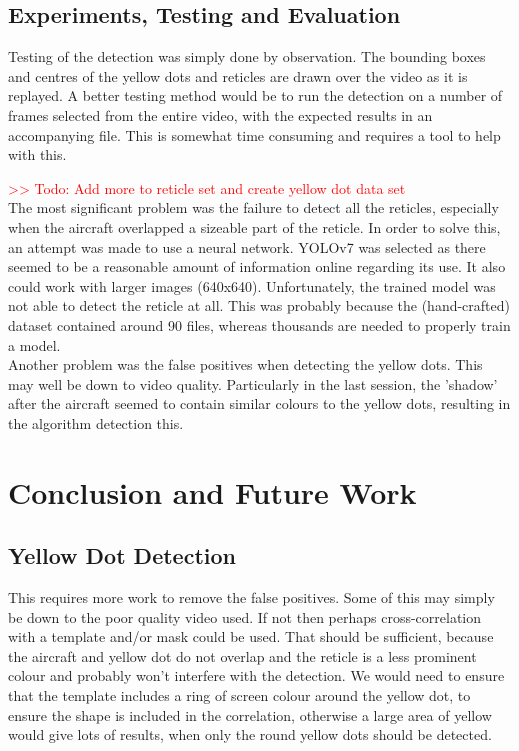 \documentclass[final]{cmpreport_02}
\begin{document}
\subsection{Experiments, Testing and Evaluation}

Testing of the detection was simply done by observation. The bounding boxes and centres of the yellow dots and reticles are drawn over the video as it is replayed. A better testing method would be to run the detection on a number of frames selected from the entire video, with the expected results in an accompanying file. This is somewhat time consuming and requires a tool to help with this.

\noindent
\textcolor{red}{>> Todo: Add more to reticle set and create yellow dot data set}\\

The most significant problem was the failure to detect all the reticles, especially when the aircraft overlapped a sizeable part of the reticle. In order to solve this, an attempt was made to use a neural network. YOLOv7 was selected as there seemed to be a reasonable amount of information online regarding its use. It also could work with larger images (640x640). Unfortunately, the trained model was not able to detect the reticle at all. This was probably because the (hand-crafted) dataset contained around 90 files, whereas thousands are needed to properly train a model.
\\
Another problem was the false positives when detecting the yellow dots. This may well be down to video quality. Particularly in the last session, the 'shadow' after the aircraft seemed to contain similar colours to the yellow dots, resulting in the algorithm detection this.

\section{Conclusion and Future Work}

\subsection{Yellow Dot Detection}

This requires more work to remove the false positives. Some of this may simply be down to the poor quality video used. If not then perhaps cross-correlation with a template and/or mask could be used. That should be sufficient, because the aircraft and yellow dot do not overlap and the reticle is a less prominent colour and probably won't interfere with the detection. We would need to ensure that the template includes a ring of screen colour around the yellow dot, to ensure the shape is included in the correlation, otherwise a large area of yellow would give lots of results, when only the round yellow dots should be detected.
\end{document}
